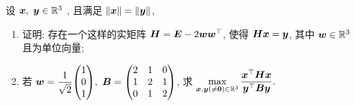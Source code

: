 \begin{example}
  设 $\vb*{x},~\vb*{y}\in \mathbb{R}^{3}$ , 且满足 $\norm{\vb*{x}}=\norm{\vb*{y}}$,
  \begin{enumerate}[label=(\arabic{*})]
    \item 证明: 存在一个这样的实矩阵 $\vb*{H}=\vb*{E}-2\vb*{ww}^\top$, 使得 $\vb*{Hx}=\vb*{y}$, 其中 $\vb*{w}\in \mathbb{R}^{3}$ 且为单位向量;
    \item 若 $\vb*{w}=\dfrac{1}{\sqrt{2}}\mqty(1\\0\\1),~\vb*{B}=\begin{pmatrix} 2 & 1 & 0 \\ 1 & 2 & 1 \\ 0 & 1 & 2 \\\end{pmatrix}$, 求 $\displaystyle \max_{\vb*{x},\vb*{y}(\neq\vb*{0})\in \mathbb{R}^{3}}\dfrac{\vb*{x}^\top\vb*{Hx}}{\vb*{y}^\top\vb*{By}}.$
  \end{enumerate}
\end{example}
